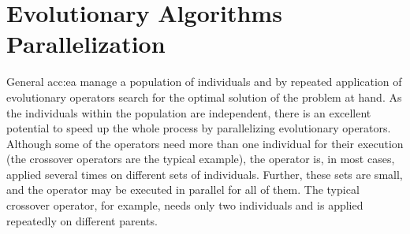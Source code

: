\section{Evolutionary Algorithms Parallelization}

General \acrlong{acc:ea} manage a population of individuals and by repeated application of evolutionary operators search for the optimal solution of the problem at hand. As the individuals within the population are independent, there is an excellent potential to speed up the whole process by parallelizing evolutionary operators. Although some of the operators need more than one indi\-vidual for their execution (the crossover operators are the typical example), the operator is, in most cases, applied several times on different sets of individuals. Further, these sets are small, and the operator may be executed in parallel for all of them. The typical crossover operator, for example, needs only two individuals and is applied repeatedly on different parents.

